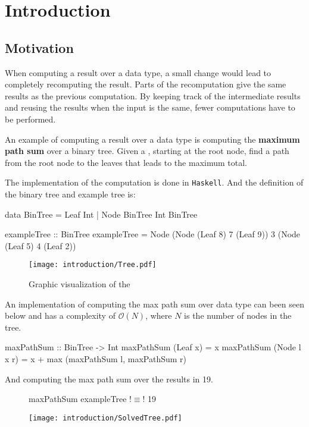 \chapter{Introduction}

\section{Motivation}
When computing a result over a data type, a small change would lead to completely recomputing the result. Parts of the recomputation give the same results as the previous computation. By keeping track of the intermediate results and reusing the results when the input is the same, fewer computations have to be performed. 

An example of computing a result over a data type is computing the \textbf{maximum path sum} over a binary tree. Given a , starting at the root node, find a path from the root node to the leaves that leads to the maximum total.

The implementation of the computation is done in \texttt{Haskell}. And the definition of the binary tree and example tree is:
\begin{haskell}
data BinTree = Leaf Int
             | Node BinTree Int BinTree 
\end{haskell}

\begin{haskell}
exampleTree :: BinTree    
exampleTree = Node (Node (Leaf 8) 7 (Leaf 9)) 3 (Node (Leaf 5) 4 (Leaf 2))
\end{haskell}

\begin{figure}[H]
    \centering
    \texttt{[image: introduction/Tree.pdf]}
    \caption{Graphic visualization of the }
\end{figure}

An implementation of computing the max path sum over data type  can been seen below and has a complexity of $\mathcal{O}(N)$, where $N$ is the number of nodes in the tree.
\begin{haskell}
maxPathSum :: BinTree -> Int
maxPathSum (Leaf x)     = x
maxPathSum (Node l x r) = x + max (maxPathSum l, maxPathSum r)
\end{haskell}

And computing the max path sum over the  results in 19.

\begin{figure}[H]
\begin{minipage}[c]{0.35\textwidth}
\begin{haskell}
maxPathSum exampleTree !$\equiv$! 19
\end{haskell}
\end{minipage}
\hspace{0.1\textwidth}
\begin{minipage}[c]{0.55\textwidth}
\texttt{[image: introduction/SolvedTree.pdf]}
\end{minipage}
\end{figure}

